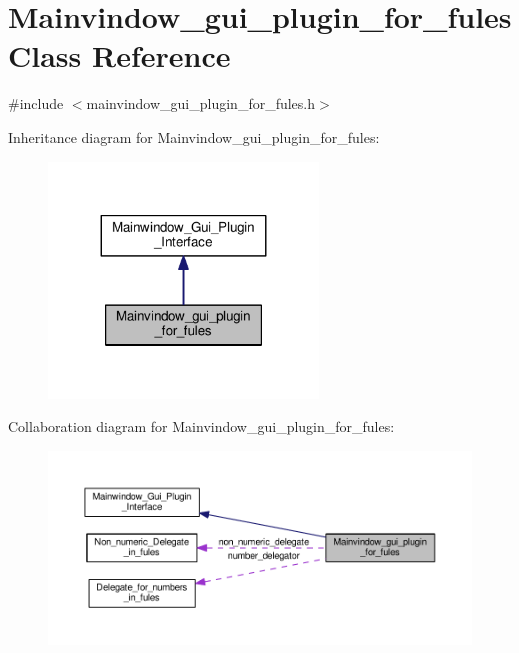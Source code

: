 \hypertarget{classMainvindow__gui__plugin__for__fules}{}\section{Mainvindow\+\_\+gui\+\_\+plugin\+\_\+for\+\_\+fules Class Reference}
\label{classMainvindow__gui__plugin__for__fules}


{\ttfamily \#include $<$mainvindow\+\_\+gui\+\_\+plugin\+\_\+for\+\_\+fules.\+h$>$}



Inheritance diagram for Mainvindow\+\_\+gui\+\_\+plugin\+\_\+for\+\_\+fules\+:\nopagebreak
\begin{figure}[H]
\begin{center}
\leavevmode
\includegraphics[width=203pt]{classMainvindow__gui__plugin__for__fules__inherit__graph}
\end{center}
\end{figure}


Collaboration diagram for Mainvindow\+\_\+gui\+\_\+plugin\+\_\+for\+\_\+fules\+:\nopagebreak
\begin{figure}[H]
\begin{center}
\leavevmode
\includegraphics[width=350pt]{classMainvindow__gui__plugin__for__fules__coll__graph}
\end{center}
\end{figure}
